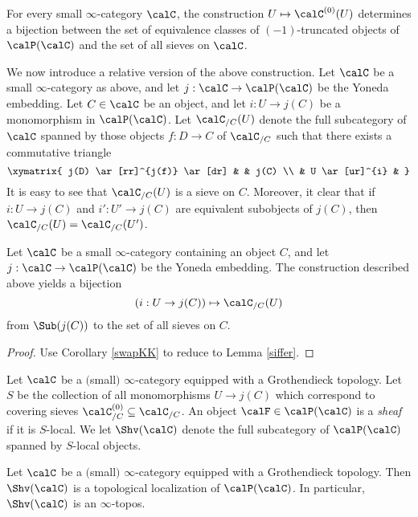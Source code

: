\begin{lemma}\label{siffer}
For every small $\infty$-category $\calC$, the construction
$U \mapsto \calC^{(0)}(U)$ determines a bijection between the set of equivalence classes of
$(-1)$-truncated objects of $\calP(\calC)$ and the set of all sieves on $\calC$.
\end{lemma}

We now introduce a relative version of the above construction. Let $\calC$ be a small $\infty$-category as above, and let $j: \calC \rightarrow \calP(\calC)$ be
the Yoneda embedding. Let $C \in \calC$ be an object, and let $i: U \rightarrow j(C)$ be a monomorphism in $\calP(\calC)$. Let $\calC_{/C}(U)$ denote the full subcategory of $\calC$
spanned by those objects $f: D \rightarrow C$ of $\calC_{/C}$ such that there exists a commutative triangle
$$ \xymatrix{ j(D) \ar[rr]^{j(f)} \ar[dr] & & j(C) \\
& U \ar[ur]^{i} & }$$
It is easy to see that $\calC_{/C}(U)$ is a sieve on $C$. Moreover, it clear that if $i: U \rightarrow j(C)$ and $i': U' \rightarrow j(C)$ are equivalent subobjects of $j(C)$, then $\calC_{/C}(U) = \calC_{/C}(U')$. 

\begin{proposition}\label{surry}
Let $\calC$ be a small $\infty$-category containing an object $C$, and let $j: \calC \rightarrow \calP(\calC)$ be the Yoneda embedding. The construction described above yields a bijection
$$ ( i: U \rightarrow j(C) ) \mapsto \calC_{/C}(U)$$
from $\Sub(j(C))$ to the set of all sieves on $C$.
\end{proposition}

\begin{proof}
Use Corollary \ref{swapKK} to reduce to Lemma \ref{siffer}.
\end{proof}

\begin{definition}\label{defsheaff}
Let $\calC$ be a $($small$)$ $\infty$-category equipped with a Grothendieck topology.
Let $S$ be the collection of all monomorphisms $U \rightarrow j(C)$ which correspond
to covering sieves $\calC^{(0)}_{/C} \subseteq \calC_{/C}$. An object
$\calF \in \calP(\calC)$ is a {\it sheaf} if it is $S$-local. We let $\Shv(\calC)$ denote the full subcategory of $\calP(\calC)$ spanned by $S$-local objects. 
\end{definition}

\begin{lemma}\label{stokeworth}
Let $\calC$ be a $($small$)$ $\infty$-category equipped with a Grothendieck topology. Then
$\Shv(\calC)$ is a topological localization of $\calP(\calC)$. In particular,
$\Shv(\calC)$ is an $\infty$-topos. 
\end{lemma}


